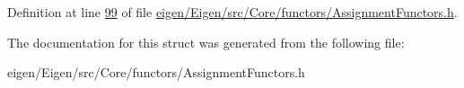Definition at line \hyperlink{eigen_2_eigen_2src_2_core_2functors_2_assignment_functors_8h_source_l00099}{99} of file \hyperlink{eigen_2_eigen_2src_2_core_2functors_2_assignment_functors_8h_source}{eigen/\+Eigen/src/\+Core/functors/\+Assignment\+Functors.\+h}.



The documentation for this struct was generated from the following file\+:\begin{DoxyCompactItemize}
\item 
eigen/\+Eigen/src/\+Core/functors/\+Assignment\+Functors.\+h\end{DoxyCompactItemize}

